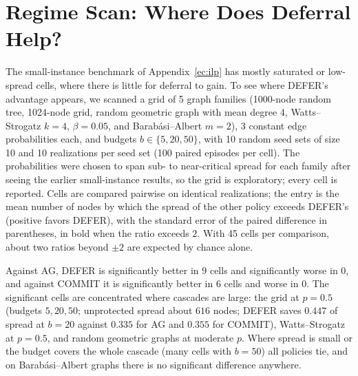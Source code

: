 \documentclass[ASNA,number]{USG}
\begin{document}
\section{Regime Scan: Where Does Deferral Help?}\label{ec:regime}

The small-instance benchmark of Appendix~\ref{ec:ilp} has mostly
saturated or low-spread cells, where there is little for deferral to gain. To
see where DEFER's advantage appears, we scanned a grid of 5 graph families
(1000-node random tree, 1024-node grid, random geometric graph with mean
degree 4, Watts--Strogatz $k=4$, $\beta=0.05$, and Barab\'asi--Albert $m=2$),
3 constant edge probabilities each, and budgets $b\in\{5,20,50\}$, with 10
random seed sets of size 10 and 10 realizations per seed set (100 paired
episodes per cell). The probabilities were chosen to span sub- to near-critical
spread for each family after seeing the earlier small-instance results, so the
grid is exploratory; every cell is reported. Cells are compared pairwise on
identical realizations; the entry is the mean number of nodes by which the
spread of the other policy exceeds DEFER's (positive favors DEFER), with the
standard error of the paired difference in parentheses, in bold when the ratio
exceeds $2$. With 45 cells per comparison, about two ratios beyond $\pm2$ are
expected by chance alone.

Against AG, DEFER is significantly better in 9 cells and significantly
worse in 0, and against COMMIT it is significantly better in 6 cells and worse in
0. The significant cells are concentrated where cascades are large:
the grid at $p=0.5$ (budgets $5,20,50$; unprotected spread about $616$ nodes;
DEFER saves $0.447$ of spread at $b=20$ against $0.335$ for AG and $0.355$ for
COMMIT), Watts--Strogatz at $p=0.5$, and random geometric graphs at moderate
$p$. Where spread is small or the budget covers the whole cascade (many cells
with $b=50$) all policies tie, and on Barab\'asi--Albert graphs there is no
significant difference anywhere.
\end{document}
